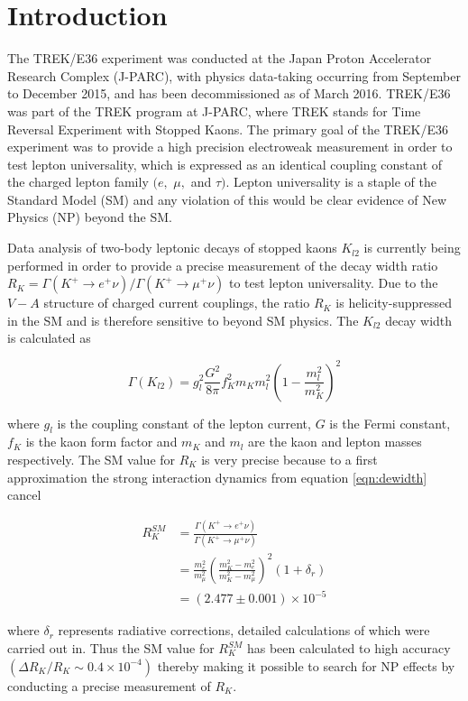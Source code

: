 \chapter{Introduction}
\label{labint}
 The TREK/E36 experiment was conducted at the Japan Proton Accelerator Research Complex (J-PARC), with physics data-taking occurring from September to December 2015, and has been decommissioned as of March 2016. TREK/E36 was part of the TREK program at J-PARC, where TREK stands for Time Reversal Experiment with Stopped Kaons. The primary goal of the TREK/E36 experiment was to provide a high precision electroweak measurement in order to test lepton universality, which is expressed as an identical coupling constant of the charged lepton family $(e,$ $\mu,$ and $\tau)$. Lepton universality is a staple of the Standard Model (SM) and any violation of this would be clear evidence of New Physics (NP) beyond the SM. 
 
 Data analysis of two-body leptonic decays of stopped kaons $K_{l2}$ is currently being performed in order to provide a precise measurement of the decay width ratio $R_K=\Gamma(K^+\rightarrow e^+\nu)/\Gamma(K^+\rightarrow\mu^+\nu)$ to test lepton universality. Due to the $V-A$ structure of charged current couplings, the ratio $R_K$ is helicity-suppressed in the SM and is therefore sensitive to beyond SM physics. The $K_{l2}$ decay width is calculated as
 
 \begin{equation}
  \Gamma(K_{l2})=g^{2}_{l}\frac{G^2}{8\pi}f^{2}_{K}m_Km^{2}_{l}\left(1-\frac{m^{2}_{l}}{m^{2}_{K}}\right)^2
  \label{eqn:dewidth}
 \end{equation}

 \noindent where $g_l$ is the coupling constant of the lepton current, $G$ is the Fermi constant, $f_K$ is the kaon form factor and $m_K$ and $m_l$ are the kaon and lepton masses respectively. The SM value for $R_K$ is very precise because to a first approximation the strong interaction dynamics from equation \ref{eqn:dewidth} cancel
 
 \begin{align}
  R^{SM}_{K}&=\frac{\Gamma(K^+\rightarrow e^+\nu)}{\Gamma(K^+\rightarrow\mu^+\nu)}\nonumber \\
  &=\frac{m^{2}_{e}}{m^{2}_{\mu}}\left(\frac{m^{2}_{K}-m^{2}_{e}}{m^{2}_{K}-m^{2}_{\mu}}\right)^2(1+\delta_r)\nonumber \\
  &=(2.477\pm0.001)\times10^{-5}
  \label{eqn:ratioRk}
 \end{align}

 where $\delta_r$ represents radiative corrections, detailed calculations of which were carried out in. Thus the SM value for $R^{SM}_{K}$ has been calculated to high accuracy $(\Delta R_K/R_K\sim0.4\times10^{-4})$ thereby making it possible to search for NP effects by conducting a precise measurement of $R_K$.
